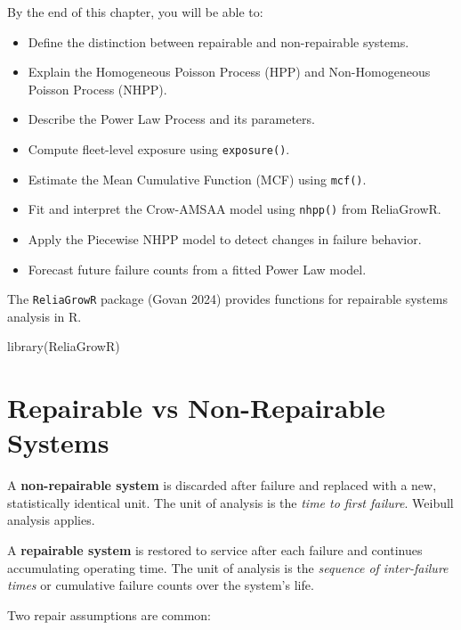 \documentclass[
  letterpaper,
  DIV=11,
  numbers=noendperiod]{scrreprt}
\newenvironment{Shaded}{\begin{snugshade}}{\end{snugshade}}
\newcommand{\FunctionTok}[1]{\textcolor[rgb]{0.28,0.35,0.67}{#1}}
\newcommand{\NormalTok}[1]{\textcolor[rgb]{0.00,0.23,0.31}{#1}}
\providecommand{\tightlist}{%
  \setlength{\itemsep}{0pt}\setlength{\parskip}{0pt}}
\begin{document}
By the end of this chapter, you will be able to:

\begin{itemize}
\tightlist
\item
  Define the distinction between repairable and non-repairable systems.
\item
  Explain the Homogeneous Poisson Process (HPP) and Non-Homogeneous
  Poisson Process (NHPP).
\item
  Describe the Power Law Process and its parameters.
\item
  Compute fleet-level exposure using \texttt{exposure()}.
\item
  Estimate the Mean Cumulative Function (MCF) using \texttt{mcf()}.
\item
  Fit and interpret the Crow-AMSAA model using \texttt{nhpp()} from
  ReliaGrowR.
\item
  Apply the Piecewise NHPP model to detect changes in failure behavior.
\item
  Forecast future failure counts from a fitted Power Law model.
\end{itemize}

The \texttt{ReliaGrowR} package (Govan 2024) provides functions for
repairable systems analysis in R.

\begin{Shaded}
\begin{Highlighting}[]
\FunctionTok{library}\NormalTok{(ReliaGrowR)}
\end{Highlighting}
\end{Shaded}

\section{Repairable vs Non-Repairable
Systems}\label{repairable-vs-non-repairable-systems}

A \textbf{non-repairable system} is discarded after failure and replaced
with a new, statistically identical unit. The unit of analysis is the
\emph{time to first failure}. Weibull analysis applies.

A \textbf{repairable system} is restored to service after each failure
and continues accumulating operating time. The unit of analysis is the
\emph{sequence of inter-failure times} or cumulative failure counts over
the system's life.

Two repair assumptions are common:
\end{document}
